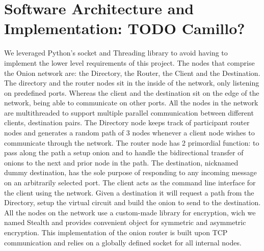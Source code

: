 \documentclass[10pt]{report}
\begin{document}
\section{Software Architecture and Implementation: TODO Camillo?}
We leveraged Python’s socket and Threading library to avoid having to implement the lower level requirements of this project.
The nodes that comprise the Onion network are: the Directory, the Router, the Client and the Destination.
The directory and the router nodes sit in the inside of the network, only listening on predefined ports.
Whereas the client and the destination sit on the edge of the network, being able to communicate on other ports.
All the nodes in the network are multithreaded to support multiple parallel communication between different clients, destination pairs.
The Directory node keeps track of participant router nodes and generates a random path of 3 nodes whenever a client node wishes to communicate through the network.
The router node has 2 primordial function: to pass along the path a setup onion and to handle the bidirectional transfer of onions to the next and prior node in the path.
The destination, nicknamed dummy destination, has the sole purpose of responding to any incoming message on an arbitrarily selected port.
The client acts as the command line interface for the client using the network. Given a destination it will request a path from the Directory, setup the virtual circuit and build the onion to send to the destination.
All the nodes on the network use a custom-made library for encryption, wich we named Stealth and provides convenient object for symmetric and asymmetric encryption.
This implementation of the onion router is built upon TCP communication and relies on a globally defined socket for all internal nodes.\\
\end{document}
